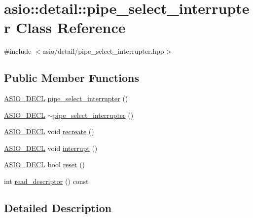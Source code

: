 \hypertarget{classasio_1_1detail_1_1pipe__select__interrupter}{}\section{asio\+:\+:detail\+:\+:pipe\+\_\+select\+\_\+interrupter Class Reference}
\label{classasio_1_1detail_1_1pipe__select__interrupter}


{\ttfamily \#include $<$asio/detail/pipe\+\_\+select\+\_\+interrupter.\+hpp$>$}

\subsection*{Public Member Functions}
\begin{DoxyCompactItemize}
\item 
\hyperlink{config_8hpp_ab54d01ea04afeb9a8b39cfac467656b7}{A\+S\+I\+O\+\_\+\+D\+E\+C\+L} \hyperlink{classasio_1_1detail_1_1pipe__select__interrupter_a706914406e2d13ef9ac3ed020af6dedb}{pipe\+\_\+select\+\_\+interrupter} ()
\item 
\hyperlink{config_8hpp_ab54d01ea04afeb9a8b39cfac467656b7}{A\+S\+I\+O\+\_\+\+D\+E\+C\+L} \hyperlink{classasio_1_1detail_1_1pipe__select__interrupter_aac55a5b53511219355f6eb74b6a79f55}{$\sim$pipe\+\_\+select\+\_\+interrupter} ()
\item 
\hyperlink{config_8hpp_ab54d01ea04afeb9a8b39cfac467656b7}{A\+S\+I\+O\+\_\+\+D\+E\+C\+L} void \hyperlink{classasio_1_1detail_1_1pipe__select__interrupter_a47d1af2c3b5e0605b03fa53701eaa6f6}{recreate} ()
\item 
\hyperlink{config_8hpp_ab54d01ea04afeb9a8b39cfac467656b7}{A\+S\+I\+O\+\_\+\+D\+E\+C\+L} void \hyperlink{classasio_1_1detail_1_1pipe__select__interrupter_a509eca01267a00b29586929a07ec6a2e}{interrupt} ()
\item 
\hyperlink{config_8hpp_ab54d01ea04afeb9a8b39cfac467656b7}{A\+S\+I\+O\+\_\+\+D\+E\+C\+L} bool \hyperlink{classasio_1_1detail_1_1pipe__select__interrupter_a890e609f4b2e3147ace1aa47be2e44ad}{reset} ()
\item 
int \hyperlink{classasio_1_1detail_1_1pipe__select__interrupter_a5de0efecc720b1594e30f409b264fb13}{read\+\_\+descriptor} () const 
\end{DoxyCompactItemize}


\subsection{Detailed Description}


